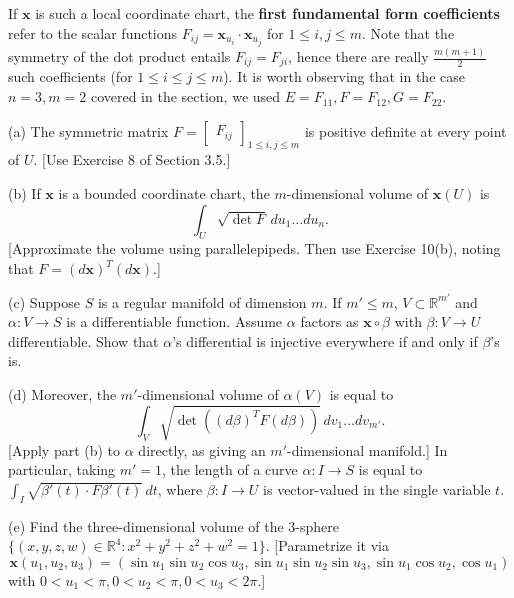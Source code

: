\documentclass[leqno]{book}
\begin{document}
\begin{enumerate}
If $\mathbf x$ is such a local coordinate chart, the \textbf{first fundamental form coefficients} refer to the scalar functions $F_{ij}=\mathbf x_{u_i}\cdot\mathbf x_{u_j}$ for $1\leqslant i,j\leqslant m$.  Note that the symmetry of the dot product entails $F_{ij}=F_{ji}$, hence there are really $\frac{m(m+1)}2$ such coefficients (for $1\leqslant i\leqslant j\leqslant m$).  It is worth observing that in the case $n=3,m=2$ covered in the section, we used $E=F_{11},F=F_{12},G=F_{22}$. %

(a) The symmetric matrix $F=\begin{bmatrix}F_{ij}\end{bmatrix}_{1\leqslant i,j\leqslant m}$ is positive definite at every point of $U$.  [Use Exercise 8 of Section 3.5.]

(b) If $\mathbf x$ is a bounded coordinate chart, the $m$-dimensional volume of $\mathbf x(U)$ is
$$\int_U\sqrt{\det F}\,du_1\dots du_n.$$
[Approximate the volume using parallelepipeds.  Then use Exercise 10(b), noting that $F=(d\mathbf x)^T(d\mathbf x)$.]

(c) Suppose $S$ is a regular manifold of dimension $m$.  If $m'\leqslant m$, $V\subset\mathbb R^{m'}$ and $\alpha:V\to S$ is a differentiable function.  Assume $\alpha$ factors as $\mathbf x\circ\beta$ with $\beta:V\to U$ differentiable.  Show that $\alpha$'s differential is injective everywhere if and only if $\beta$'s is.

(d) Moreover, the $m'$-dimensional volume of $\alpha(V)$ is equal to
$$\int_V\sqrt{\det((d\beta)^TF(d\beta))}\,dv_1\dots dv_{m'}.$$
[Apply part (b) to $\alpha$ directly, as giving an $m'$-dimensional manifold.]  In particular, taking $m'=1$, the length of a curve $\alpha:I\to S$ is equal to $\int_I\sqrt{\beta'(t)\cdot F\beta'(t)}\,dt$, where $\beta:I\to U$ is vector-valued in the single variable $t$.

(e) Find the three-dimensional volume of the 3-sphere $\{(x,y,z,w)\in\mathbb R^4:x^2+y^2+z^2+w^2=1\}$.  [Parametrize it via
$$\mathbf x(u_1,u_2,u_3)=(\sin u_1\sin u_2\cos u_3,\sin u_1\sin u_2\sin u_3,\sin u_1\cos u_2,\cos u_1)$$
with $0<u_1<\pi,0<u_2<\pi,0<u_3<2\pi$.] %


\end{enumerate}
\end{document}

